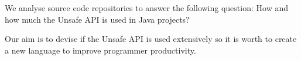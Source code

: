 
We analyse source code repositories to answer the following question: How and how much the Unsafe API is used in Java projects?

Our aim is to devise if the Unsafe API is used extensively so it is worth to create a new language to improve programmer productivity.